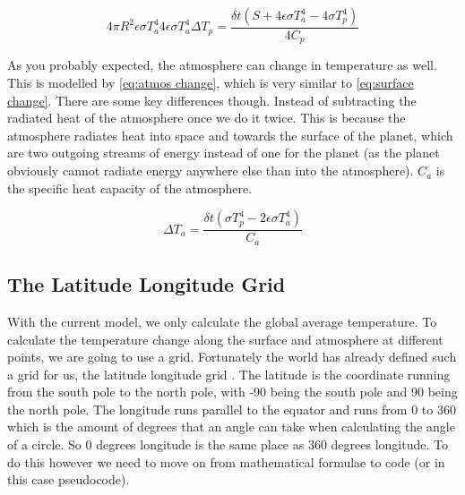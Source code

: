 \begin{subequations}
    \label{eq:atmos}
    \begin{equation}
        \label{eq:atmos on surface}
        4\pi R^2 \epsilon \sigma T_a^4
    \end{equation}
    \begin{equation}
        \label{eq:atmos on surface improved}
        4\epsilon \sigma T_a^4
    \end{equation}
    \begin{equation}
        \label{eq:surface change}
        \Delta T_p = \frac{\delta t (S + 4\epsilon \sigma T_a^4 - 4\sigma T_p^4)}{4C_p}
    \end{equation}
\end{subequations}

As you probably expected, the atmosphere can change in temperature as well. This is modelled by \autoref{eq:atmos change}, which is very similar to \autoref{eq:surface change}. There are
some key differences though. Instead of subtracting the radiated heat of the atmosphere once we do it twice. This is because the atmosphere radiates heat into space and towards the 
surface of the planet, which are two outgoing streams of energy instead of one for the planet (as the planet obviously cannot radiate energy anywhere else than into the atmosphere).
$C_a$ is the specific heat capacity of the atmosphere.

\begin{equation}
    \label{eq:atmos change}
    \Delta T_a = \frac{\delta t (\sigma T_p^4 - 2\epsilon\sigma T_a^4)}{C_a}
\end{equation}

\subsection{The Latitude Longitude Grid}
With the current model, we only calculate the global average temperature. To calculate the temperature change along the surface and atmosphere at different points, we are going to use a grid.
Fortunately the world has already defined such a grid for us, the latitude longitude grid \cite{latlong}. The latitude is the coordinate running from the south pole to the north pole, with -90 
being the south pole and 90 being the north pole. The longitude runs parallel to the equator and runs from 0 to 360 which is the amount of degrees that an angle can take when calculating the 
angle of a circle. So 0 degrees longitude is the same place as 360 degrees longitude. To do this however we need to move on from mathematical formulae to code (or in this case pseudocode).

